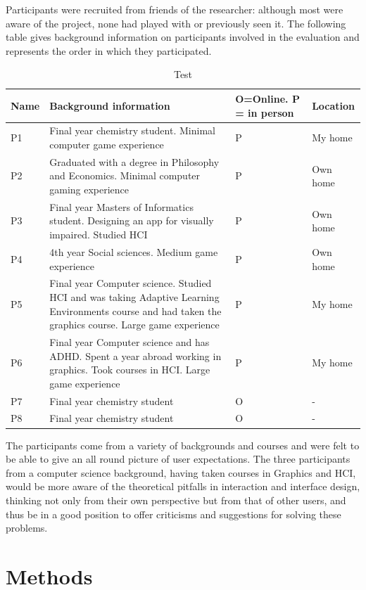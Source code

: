 \documentclass[11pt]{report}
\begin{document}
Participants were recruited from friends of the researcher: although most were aware of the project, none had played with or previously seen it. The following table gives background information on participants involved in the evaluation and represents the order in which they participated.

\begin{table}[H]
    \begin{tabular}{| p{2cm} | p{9cm} | p{3cm} | p{3cm} |}
    \hline
    Name & Background information & O=Online. P = in person & Location \\
    \hline
    \hline
    P1 & Final year chemistry student. Minimal computer game experience & P & My home\\ \hline
    P2 & Graduated with a degree in Philosophy and Economics. Minimal computer gaming experience & P & Own home \\ \hline
    P3 & Final year Masters of Informatics student. Designing an app for visually impaired. Studied HCI & P & Own home \\ \hline
    P4 & 4th year Social sciences. Medium game experience & P & Own home \\ \hline
    P5 & Final year Computer science. Studied HCI and was taking Adaptive Learning Environments course and had taken the graphics course. Large game experience & P & My home \\ \hline
    P6 & Final year Computer science and has ADHD. Spent a year abroad working in graphics. Took courses in HCI. Large game experience & P & My home \\ \hline
    P7 & Final year chemistry student & O & -\\ \hline
    P8 & Final year chemistry student & O & - \\ \hline
    \end{tabular}
    \caption{Test}
\end{table}

The participants come from a variety of backgrounds and courses and were felt to be able to give an all round picture of user expectations. The three participants from a computer science background, having taken courses in Graphics and HCI, would be more aware of the theoretical pitfalls in interaction and interface design, thinking not only from their own perspective but from that of other users, and thus be in a good position to offer criticisms and suggestions for solving these problems.

\section{Methods}
\end{document}
